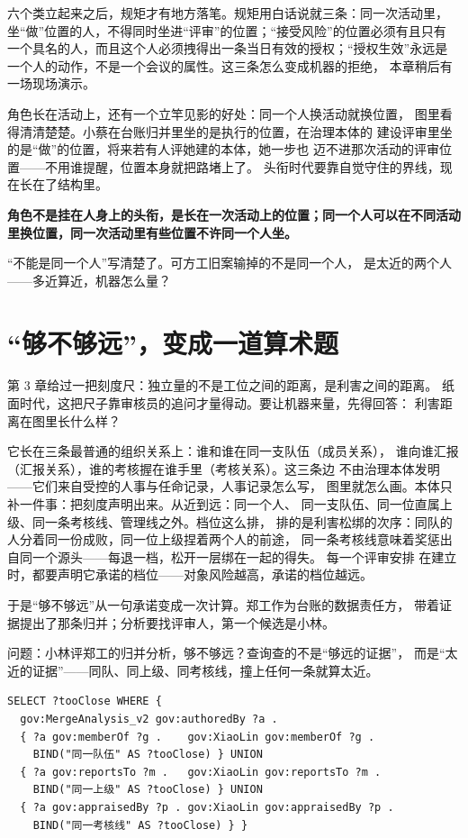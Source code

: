 六个类立起来之后，规矩才有地方落笔。规矩用白话说就三条：同一次活动里，
坐“做”位置的人，不得同时坐进“评审”的位置；“接受风险”的位置必须有且只有
一个具名的人，而且这个人必须拽得出一条当日有效的授权；“授权生效”永远是
一个人的动作，不是一个会议的属性。这三条怎么变成机器的拒绝，
本章稍后有一场现场演示。

角色长在活动上，还有一个立竿见影的好处：同一个人换活动就换位置，
图里看得清清楚楚。小蔡在台账归并里坐的是执行的位置，在治理本体的
建设评审里坐的是“做”的位置，将来若有人评她建的本体，她一步也
迈不进那次活动的评审位置——不用谁提醒，位置本身就把路堵上了。
头衔时代要靠自觉守住的界线，现在长在了结构里。

\textbf{角色不是挂在人身上的头衔，是长在一次活动上的位置；同一个人可以在不同活动里换位置，同一次活动里有些位置不许同一个人坐。}

“不能是同一个人”写清楚了。可方工旧案输掉的不是同一个人，
是太近的两个人——多近算近，机器怎么量？

\section{“够不够远”，变成一道算术题}

第 3 章给过一把刻度尺：独立量的不是工位之间的距离，是利害之间的距离。
纸面时代，这把尺子靠审核员的追问才量得动。要让机器来量，先得回答：
利害距离在图里长什么样？

它长在三条最普通的组织关系上：谁和谁在同一支队伍（成员关系），
谁向谁汇报（汇报关系），谁的考核握在谁手里（考核关系）。这三条边
不由治理本体发明——它们来自受控的人事与任命记录，人事记录怎么写，
图里就怎么画。本体只补一件事：把刻度声明出来。从近到远：同一个人、
同一支队伍、同一位直属上级、同一条考核线、管理线之外。档位这么排，
排的是利害松绑的次序：同队的人分着同一份成败，同一位上级捏着两个人的前途，
同一条考核线意味着奖惩出自同一个源头——每退一档，松开一层绑在一起的得失。
每一个评审安排
在建立时，都要声明它承诺的档位——对象风险越高，承诺的档位越远。

于是“够不够远”从一句承诺变成一次计算。郑工作为台账的数据责任方，
带着证据提出了那条归并；分析要找评审人，第一个候选是小林。

问题：小林评郑工的归并分析，够不够远？查询查的不是“够远的证据”，
而是“太近的证据”——同队、同上级、同考核线，撞上任何一条就算太近。

\nopagebreak[4]
\begin{codebox}
\begin{Verbatim}[fontsize=\small,breaklines=true,breakanywhere=true,breaksymbolleft={},breaksymbolright={}]
SELECT ?tooClose WHERE {
  gov:MergeAnalysis_v2 gov:authoredBy ?a .
  { ?a gov:memberOf ?g .    gov:XiaoLin gov:memberOf ?g .
    BIND("同一队伍" AS ?tooClose) } UNION
  { ?a gov:reportsTo ?m .   gov:XiaoLin gov:reportsTo ?m .
    BIND("同一上级" AS ?tooClose) } UNION
  { ?a gov:appraisedBy ?p . gov:XiaoLin gov:appraisedBy ?p .
    BIND("同一考核线" AS ?tooClose) } }
\end{Verbatim}
\end{codebox}

